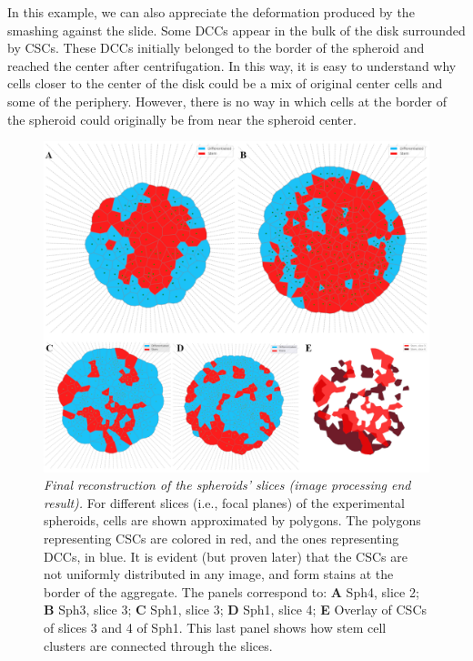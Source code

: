 \documentclass[fleqn,10pt]{wlscirep}
\begin{document}
In this example, we can also appreciate the deformation produced by the smashing against the slide. Some DCCs appear in the bulk of the disk surrounded by CSCs. These DCCs  initially belonged to the border of the spheroid and reached the center after centrifugation. In this way, it is easy to understand why cells closer to the center of the disk could be a mix of original center cells and some of the periphery. However, there is no way in which cells at the border of the spheroid could originally be from near the spheroid center.




\begin{figure}[h!]
    \includegraphics[width=\linewidth]{images/voronoi.eps}
    \caption{\emph{Final reconstruction of the spheroids' slices (image processing end result).} For different slices (i.e., focal planes) of the experimental spheroids, cells are shown approximated by polygons. The polygons representing CSCs are colored in red, and the ones representing DCCs, in blue. It is evident (but proven later) that the CSCs are not uniformly distributed in any image, and form stains at the border of the aggregate. The panels correspond to: \textbf{A} {\textsf Sph4, slice 2}; \textbf{B} {\textsf Sph3, slice 3}; \textbf{C} {\textsf Sph1, slice 3}; \textbf{D} {\textsf Sph1, slice 4}; \textbf{E} Overlay of CSCs of slices 3 and 4 of {\textsf Sph1}. This last panel shows how stem cell clusters are connected through the slices. }\label{fig: blue red}
\end{figure}
\end{document}
